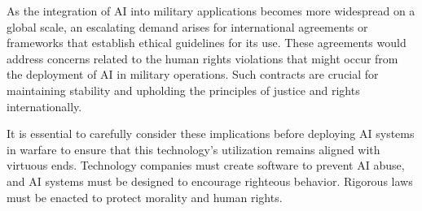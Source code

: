 \documentclass[12pt]{article}
\begin{document}
As the integration of AI into military applications becomes more widespread on a global scale, an escalating demand arises for international agreements or frameworks that establish ethical guidelines for its use. These agreements would address concerns related to the human rights violations that might occur from the deployment of AI in military operations. Such contracts are crucial for maintaining stability and upholding the principles of justice and rights internationally.

It is essential to carefully consider these implications before deploying AI systems in warfare to ensure that this technology's utilization remains aligned with virtuous ends. Technology companies must create software to prevent AI abuse, and AI systems must be designed to encourage righteous behavior. Rigorous laws must be enacted to protect morality and human rights.

\printbibliography
\end{document}
